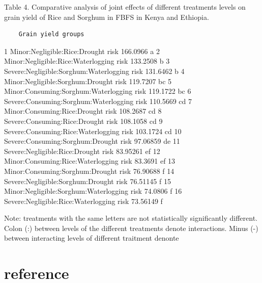 \documentclass[12pt,oneside]{article}
\begin{document}
Table 4. Comparative analysis of joint effects of different treatments levels on grain yield of Rice and Sorghum in FBFS in Kenya and Ethiopia.

\begin{verbatim}
    Grain yield groups
\end{verbatim}

1 Minor:Negligible:Rice:Drought risk 166.0966 a
2 Minor:Negligible:Rice:Waterlogging risk 133.2508 b
3 Severe:Negligible:Sorghum:Waterlogging risk 131.6462 b
4 Minor:Negligible:Sorghum:Drought risk 119.7207 bc
5 Minor:Consuming:Sorghum:Waterlogging risk 119.1722 bc
6 Severe:Consuming:Sorghum:Waterlogging risk 110.5669 cd
7 Minor:Consuming:Rice:Drought risk 108.2687 cd
8 Severe:Consuming:Rice:Drought risk 108.1058 cd
9 Severe:Consuming:Rice:Waterlogging risk 103.1724 cd
10 Severe:Consuming:Sorghum:Drought risk 97.06859 de
11 Severe:Negligible:Rice:Drought risk 83.95261 ef
12 Minor:Consuming:Rice:Waterlogging risk 83.3691 ef
13 Minor:Consuming:Sorghum:Drought risk 76.90688 f
14 Severe:Negligible:Sorghum:Drought risk 76.51145 f
15 Minor:Negligible:Sorghum:Waterlogging risk 74.0806 f
16 Severe:Negligible:Rice:Waterlogging risk 73.56149 f

Note: treatments with the same letters are not statistically significantly different. Colon (:) between levels of the different treatments denote interactions. Minus (-) between interacting levels of different traitment denonte

\hypertarget{VI}{%
\section{reference}\label{VI}}
\end{document}
